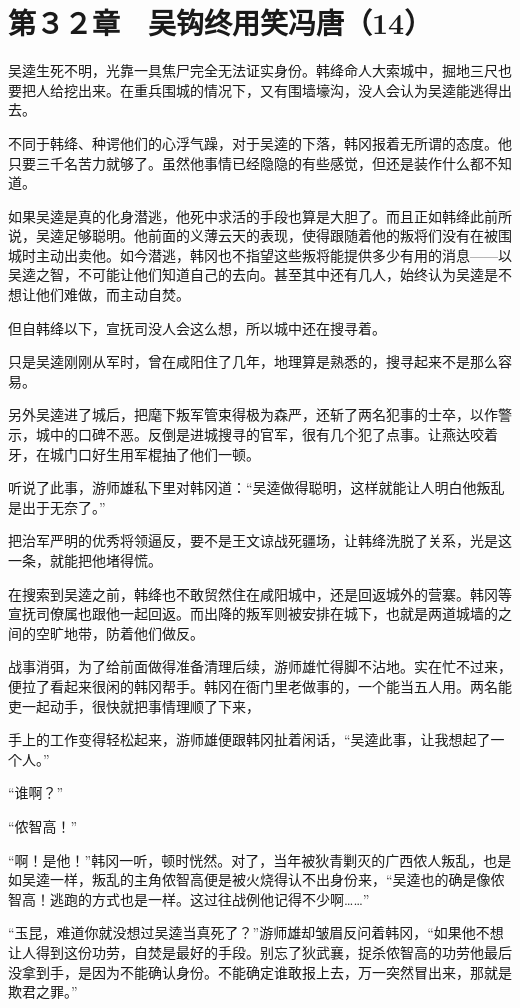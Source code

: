 \section{第３２章　吴钩终用笑冯唐（14） }

吴逵生死不明，光靠一具焦尸完全无法证实身份。韩绛命人大索城中，掘地三尺也要把人给挖出来。在重兵围城的情况下，又有围墙壕沟，没人会认为吴逵能逃得出去。

不同于韩绛、种谔他们的心浮气躁，对于吴逵的下落，韩冈报着无所谓的态度。他只要三千名苦力就够了。虽然他事情已经隐隐的有些感觉，但还是装作什么都不知道。

如果吴逵是真的化身潜逃，他死中求活的手段也算是大胆了。而且正如韩绛此前所说，吴逵足够聪明。他前面的义薄云天的表现，使得跟随着他的叛将们没有在被围城时主动出卖他。如今潜逃，韩冈也不指望这些叛将能提供多少有用的消息——以吴逵之智，不可能让他们知道自己的去向。甚至其中还有几人，始终认为吴逵是不想让他们难做，而主动自焚。

但自韩绛以下，宣抚司没人会这么想，所以城中还在搜寻着。

只是吴逵刚刚从军时，曾在咸阳住了几年，地理算是熟悉的，搜寻起来不是那么容易。

另外吴逵进了城后，把麾下叛军管束得极为森严，还斩了两名犯事的士卒，以作警示，城中的口碑不恶。反倒是进城搜寻的官军，很有几个犯了点事。让燕达咬着牙，在城门口好生用军棍抽了他们一顿。

听说了此事，游师雄私下里对韩冈道：“吴逵做得聪明，这样就能让人明白他叛乱是出于无奈了。”

把治军严明的优秀将领逼反，要不是王文谅战死疆场，让韩绛洗脱了关系，光是这一条，就能把他堵得慌。

在搜索到吴逵之前，韩绛也不敢贸然住在咸阳城中，还是回返城外的营寨。韩冈等宣抚司僚属也跟他一起回返。而出降的叛军则被安排在城下，也就是两道城墙的之间的空旷地带，防着他们做反。

战事消弭，为了给前面做得准备清理后续，游师雄忙得脚不沾地。实在忙不过来，便拉了看起来很闲的韩冈帮手。韩冈在衙门里老做事的，一个能当五人用。两名能吏一起动手，很快就把事情理顺了下来，

手上的工作变得轻松起来，游师雄便跟韩冈扯着闲话，“吴逵此事，让我想起了一个人。”

“谁啊？”

“侬智高！”

“啊！是他！”韩冈一听，顿时恍然。对了，当年被狄青剿灭的广西侬人叛乱，也是如吴逵一样，叛乱的主角侬智高便是被火烧得认不出身份来，“吴逵也的确是像侬智高！逃跑的方式也是一样。这过往战例他记得不少啊……”

“玉昆，难道你就没想过吴逵当真死了？”游师雄却皱眉反问着韩冈，“如果他不想让人得到这份功劳，自焚是最好的手段。别忘了狄武襄，捉杀侬智高的功劳他最后没拿到手，是因为不能确认身份。不能确定谁敢报上去，万一突然冒出来，那就是欺君之罪。”


